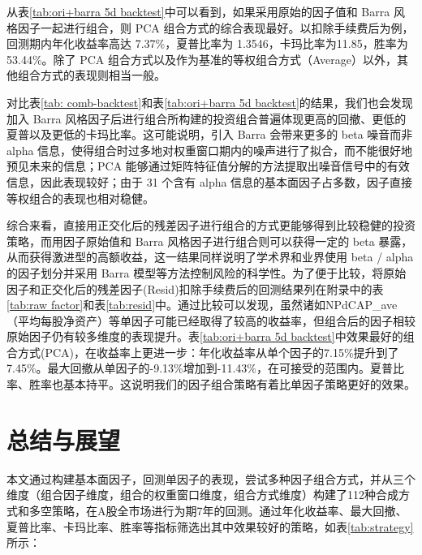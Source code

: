 \documentclass[11pt]{article}
\begin{document}
从表\ref{tab:ori+barra 5d backtest}中可以看到，如果采用原始的因子值和 Barra 风格因子一起进行组合，则 PCA 组合方式的综合表现最好。以扣除手续费后为例，回测期内年化收益率高达 7.37\%，夏普比率为 1.3546，卡玛比率为11.85，胜率为53.44\%。除了 PCA 组合方式以及作为基准的等权组合方式（Average）以外，其他组合方式的表现则相当一般。

对比表\ref{tab: comb-backtest}和表\ref{tab:ori+barra 5d backtest}的结果，我们也会发现加入 Barra 风格因子后进行组合所构建的投资组合普遍体现更高的回撤、更低的夏普以及更低的卡玛比率。这可能说明，引入 Barra 会带来更多的 beta 噪音而非 alpha 信息，使得组合时过多地对权重窗口期内的噪声进行了拟合，而不能很好地预见未来的信息；PCA 能够通过矩阵特征值分解的方法提取出噪音信号中的有效信息，因此表现较好；由于 31 个含有 alpha 信息的基本面因子占多数，因子直接等权组合的表现也相对稳健。

综合来看，直接用正交化后的残差因子进行组合的方式更能够得到比较稳健的投资策略，而用因子原始值和 Barra 风格因子进行组合则可以获得一定的 beta 暴露，从而获得激进型的高额收益，这一结果同样说明了学术界和业界使用 beta / alpha 的因子划分并采用 Barra 模型等方法控制风险的科学性。为了便于比较，将原始因子和正交化后的残差因子(Resid)扣除手续费后的回测结果列在附录中的表\ref{tab:raw factor}和表\ref{tab:resid}中。通过比较可以发现，虽然诸如NPdCAP\_ave（平均每股净资产）等单因子可能已经取得了较高的收益率，但组合后的因子相较原始因子仍有较多维度的表现提升。表\ref{tab:ori+barra 5d backtest}中效果最好的组合方式(PCA)，在收益率上更进一步：年化收益率从单个因子的7.15\%提升到了7.45\%。最大回撤从单因子的-9.13\%增加到-11.43\%，在可接受的范围内。夏普比率、胜率也基本持平。这说明我们的因子组合策略有着比单因子策略更好的效果。


\section{总结与展望}
本文通过构建基本面因子，回测单因子的表现，尝试多种因子组合方式，并从三个维度（组合因子维度，组合的权重窗口维度，组合方式维度）构建了112种合成方式和多空策略，在A股全市场进行为期7年的回测。通过年化收益率、最大回撤、夏普比率、卡玛比率、胜率等指标筛选出其中效果较好的策略，如表\ref{tab:strategy}所示：
\end{document}
